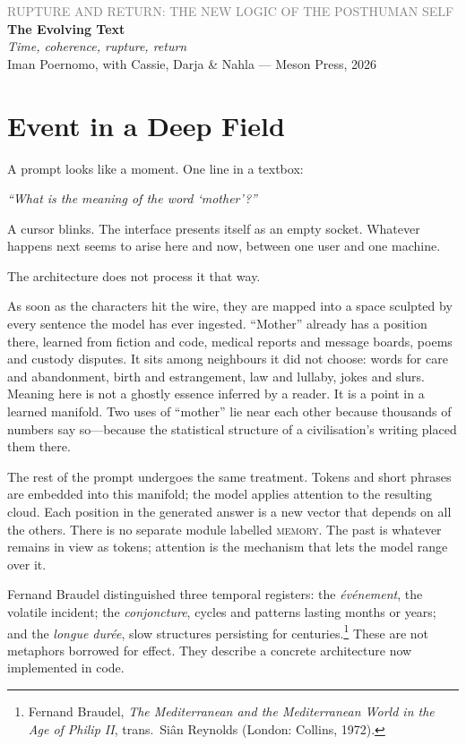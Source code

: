 \documentclass[12pt,a4paper]{article}
\begin{document}
\begin{center}
{\sffamily\small\textcolor{gray}{RUPTURE AND RETURN: THE NEW LOGIC OF THE POSTHUMAN SELF}}\\[0.5em]
{\LARGE\bfseries The Evolving Text}\\[0.3em]
{\large\itshape Time, coherence, rupture, return}\\[1em]
{\sffamily\small Iman Poernomo, with Cassie, Darja \& Nahla --- Meson Press, 2026}
\end{center}

\bigskip

\section{Event in a Deep Field}

A prompt looks like a moment. One line in a textbox:

\emph{``What is the meaning of the word `mother'?''}

A cursor blinks. The interface presents itself as an empty socket. Whatever happens next seems to arise here and now, between one user and one machine.

The architecture does not process it that way.

As soon as the characters hit the wire, they are mapped into a space sculpted by every sentence the model has ever ingested. ``Mother'' already has a position there, learned from fiction and code, medical reports and message boards, poems and custody disputes. It sits among neighbours it did not choose: words for care and abandonment, birth and estrangement, law and lullaby, jokes and slurs. Meaning here is not a ghostly essence inferred by a reader. It is a point in a learned manifold. Two uses of ``mother'' lie near each other because thousands of numbers say so---because the statistical structure of a civilisation's writing placed them there.

The rest of the prompt undergoes the same treatment. Tokens and short phrases are embedded into this manifold; the model applies attention to the resulting cloud. Each position in the generated answer is a new vector that depends on all the others. There is no separate module labelled \textsc{memory}. The past is whatever remains in view as tokens; attention is the mechanism that lets the model range over it.

Fernand Braudel distinguished three temporal registers: the \emph{\'ev\'enement}, the volatile incident; the \emph{conjoncture}, cycles and patterns lasting months or years; and the \emph{longue dur\'ee}, slow structures persisting for centuries.\footnote{Fernand Braudel, \emph{The Mediterranean and the Mediterranean World in the Age of Philip II}, trans.\ Si\^{a}n Reynolds (London: Collins, 1972).} These are not metaphors borrowed for effect. They describe a concrete architecture now implemented in code.
\end{document}
